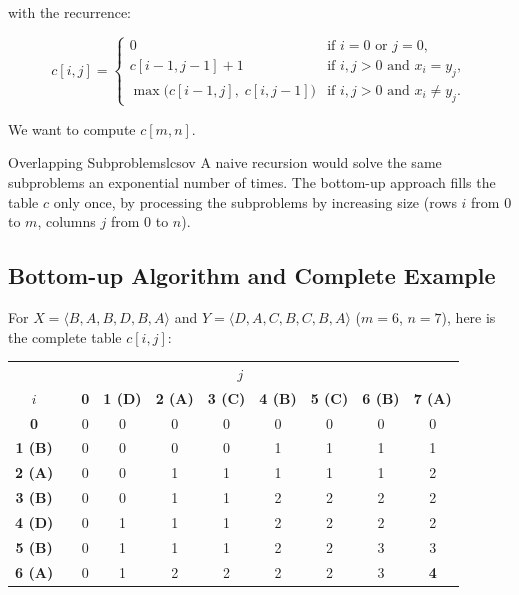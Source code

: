 with the recurrence:

\[
  c[i, j] =
  \begin{cases}
    0 & \text{if } i = 0 \text{ or } j = 0, \\
    c[i-1, j-1] + 1 & \text{if } i, j > 0 \text{ and } x_i = y_j, \\
    \max\bigl(c[i-1, j],\; c[i, j-1]\bigr) & \text{if } i, j > 0 \text{ and } x_i \ne y_j.
  \end{cases}
\]

We want to compute $c[m, n]$.

\begin{remark}{Overlapping Subproblems}{lcsov}
A naive recursion would solve the same subproblems an exponential number of times.
The bottom-up approach fills the table $c$ only once, by processing the
subproblems by increasing size (rows $i$ from $0$ to $m$, columns $j$ from $0$ to $n$).
\end{remark}

\subsection{Bottom-up Algorithm and Complete Example}

For $X = \langle B,A,B,D,B,A \rangle$ and $Y = \langle D,A,C,B,C,B,A \rangle$
($m = 6$, $n = 7$), here is the complete table $c[i,j]$:

\begin{center}
\renewcommand{\arraystretch}{1.4}
\begin{tabular}{|c|c|c|c|c|c|c|c|c|c|}
& & \multicolumn{7}{c}{$j$} \\
$i$ & & \textbf{0} & \textbf{1 (D)} & \textbf{2 (A)} & \textbf{3 (C)} &
          \textbf{4 (B)} & \textbf{5 (C)} & \textbf{6 (B)} & \textbf{7 (A)} \\
\hline
\textbf{0}      & & 0 & 0 & 0 & 0 & 0 & 0 & 0 & 0 \\
\textbf{1 (B)}  & & 0 & 0 & 0 & 0 & 1 & 1 & 1 & 1 \\
\textbf{2 (A)}  & & 0 & 0 & 1 & 1 & 1 & 1 & 1 & 2 \\
\textbf{3 (B)}  & & 0 & 0 & 1 & 1 & 2 & 2 & 2 & 2 \\
\textbf{4 (D)}  & & 0 & 1 & 1 & 1 & 2 & 2 & 2 & 2 \\
\textbf{5 (B)}  & & 0 & 1 & 1 & 1 & 2 & 2 & 3 & 3 \\
\textbf{6 (A)}  & & 0 & 1 & 2 & 2 & 2 & 2 & 3 & \cellcolor{blue!20}\textbf{4} \\
\end{tabular}
\end{center}


